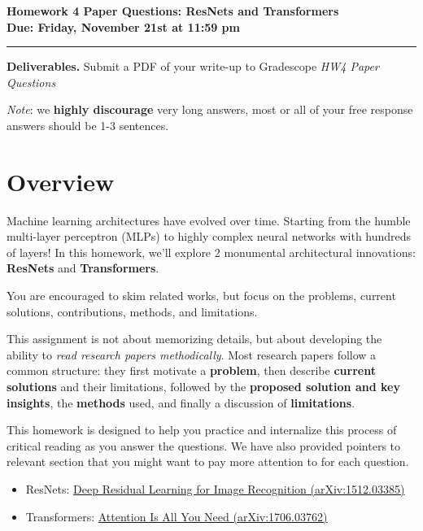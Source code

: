 \documentclass[11pt]{article}
\begin{document}
\begin{center}
    {\huge\bfseries Homework 4 Paper Questions: ResNets and Transformers}\\[6pt]
    \textbf{Due: Friday, November 21st at 11:59 pm}\\
\end{center}

\vspace{0.5em}\hrule\vspace{1em}

\noindent\textbf{Deliverables.} Submit a PDF of your write-up to Gradescope \emph{HW4 Paper Questions}

\noindent \textit{Note}: we \textbf{highly discourage} very long answers, most or all of your free response answers should be 1-3 sentences.
\vspace{0.3em}
\section*{Overview}
Machine learning architectures have evolved over time. Starting from the humble multi-layer perceptron (MLPs) to highly complex neural networks with hundreds of layers! In this homework, we'll explore 2 monumental architectural innovations: \textbf{ResNets} and \textbf{Transformers}.

You are encouraged to skim related works, but focus on the problems, current solutions, contributions, methods, and limitations.  

This assignment is not about memorizing details, but about developing the ability to \emph{read research papers methodically}.  
Most research papers follow a common structure: they first motivate a \textbf{problem}, then describe \textbf{current solutions} and their limitations, followed by the \textbf{proposed solution and key insights}, the \textbf{methods} used, and finally a discussion of \textbf{limitations}.  

This homework is designed to help you practice and internalize this process of critical reading as you answer the questions. We have also provided pointers to relevant section that you might want to pay more attention to for each question.

\begin{itemize}
  \item ResNets: \href{https://arxiv.org/abs/1512.03385}{Deep Residual Learning for Image Recognition (arXiv:1512.03385)}
  \item Transformers: \href{https://arxiv.org/abs/1706.03762}
  {Attention Is All You Need (arXiv:1706.03762)}
\end{itemize}
\end{document}
